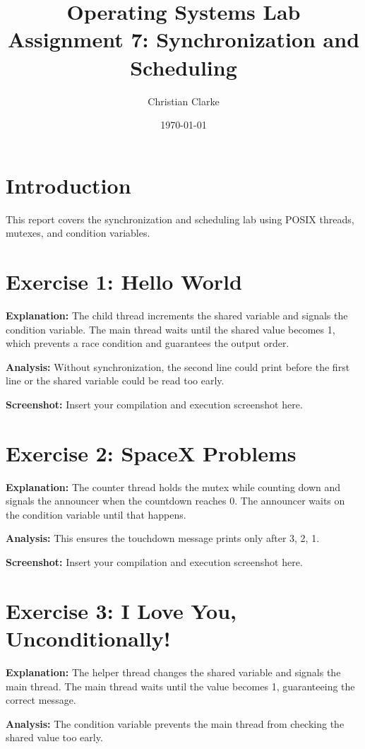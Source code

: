 \documentclass{article}
\title{Operating Systems Lab Assignment 7: Synchronization and Scheduling}
\author{Christian Clarke}
\date{\today}
\begin{document}
\maketitle

\section{Introduction}
This report covers the synchronization and scheduling lab using POSIX threads, mutexes, and condition variables.

\section{Exercise 1: Hello World}

\textbf{Explanation:} The child thread increments the shared variable and signals the condition variable. The main thread waits until the shared value becomes 1, which prevents a race condition and guarantees the output order.

\textbf{Analysis:} Without synchronization, the second line could print before the first line or the shared variable could be read too early.

\textbf{Screenshot:} Insert your compilation and execution screenshot here.

\section{Exercise 2: SpaceX Problems}

\textbf{Explanation:} The counter thread holds the mutex while counting down and signals the announcer when the countdown reaches 0. The announcer waits on the condition variable until that happens.

\textbf{Analysis:} This ensures the touchdown message prints only after 3, 2, 1.

\textbf{Screenshot:} Insert your compilation and execution screenshot here.

\section{Exercise 3: I Love You, Unconditionally!}

\textbf{Explanation:} The helper thread changes the shared variable and signals the main thread. The main thread waits until the value becomes 1, guaranteeing the correct message.

\textbf{Analysis:} The condition variable prevents the main thread from checking the shared value too early.
\end{document}
